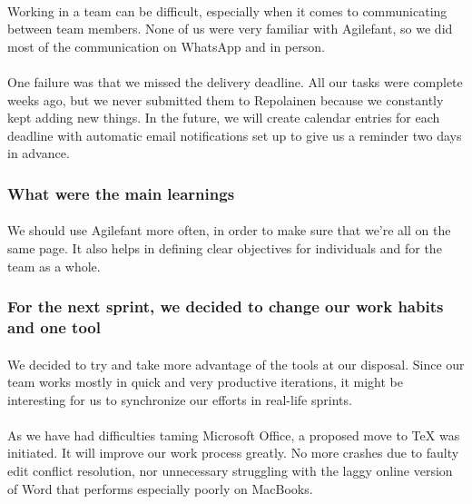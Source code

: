 \paragraph{} Working in a team can be difficult, especially when it comes to communicating between team members. None of us were very familiar with Agilefant, so we did most of the communication on WhatsApp and in person.

\paragraph{} One failure was that we missed the delivery deadline. All our tasks were complete weeks ago, but we never submitted them to Repolainen because we constantly kept adding new things. In the future, we will create calendar entries for each deadline with automatic email notifications set up to give us a reminder two days in advance.

\subsubsection{What were the main learnings}

\paragraph{} We should use Agilefant more often, in order to make sure that we’re all on the same page. It also helps in defining clear objectives for individuals and for the team as a whole.

\subsubsection{For the next sprint, we decided to change our work habits and one tool}

\paragraph{} We decided to try and take more advantage of the tools at our disposal. Since our team works mostly in quick and very productive iterations, it might be interesting for us to synchronize our efforts in real-life sprints.

\paragraph{} As we have had difficulties taming Microsoft Office, a proposed move to TeX was initiated. It will improve our work process greatly. No more crashes due to faulty edit conflict resolution, nor unnecessary struggling with the laggy online version of Word that performs especially poorly on MacBooks.

